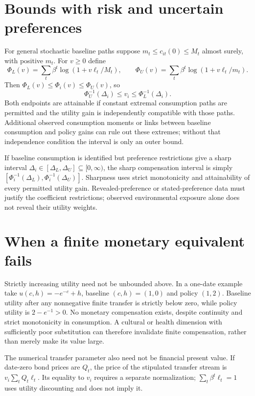 \documentclass[11pt]{article}
\begin{document}
\section*{Bounds with risk and uncertain preferences}
For general stochastic baseline paths suppose $m_t\leq c_{it}(0)\leq M_t$ almost surely, with positive $m_t$. For $v\geq0$ define
\[
 \Phi_L(v)=\sum_t\beta^t\log(1+v\ell_t/M_t),\qquad
 \Phi_U(v)=\sum_t\beta^t\log(1+v\ell_t/m_t).
\]
Then $\Phi_L(v)\leq\Phi_i(v)\leq\Phi_U(v)$, so
\[
              \Phi_U^{-1}(\Delta_i)\leq v_i\leq\Phi_L^{-1}(\Delta_i).
\]
Both endpoints are attainable if constant extremal consumption paths are permitted and the utility gain is independently compatible with those paths. Additional observed consumption moments or links between baseline consumption and policy gains can rule out these extremes; without that independence condition the interval is only an outer bound.

If baseline consumption is identified but preference restrictions give a sharp interval $\Delta_i\in[\Delta_L,\Delta_U]\subseteq[0,\infty)$, the sharp compensation interval is simply
$[\Phi_i^{-1}(\Delta_L),\Phi_i^{-1}(\Delta_U)]$.
Sharpness uses strict monotonicity and attainability of every permitted utility gain. Revealed-preference or stated-preference data must justify the coefficient restrictions; observed environmental exposure alone does not reveal their utility weights.

\section*{When a finite monetary equivalent fails}
Strictly increasing utility need not be unbounded above. In a one-date example take $u(c,h)=-e^{-c}+h$, baseline $(c,h)=(1,0)$ and policy $(1,2)$. Baseline utility after any nonnegative finite transfer is strictly below zero, while policy utility is $2-e^{-1}>0$. No monetary compensation exists, despite continuity and strict monotonicity in consumption. A cultural or health dimension with sufficiently poor substitution can therefore invalidate finite compensation, rather than merely make its value large.

The numerical transfer parameter also need not be financial present value. If date-zero bond prices are $Q_t$, the price of the stipulated transfer stream is $v_i\sum_tQ_t\ell_t$. Its equality to $v_i$ requires a separate normalization; $\sum_t\beta^t\ell_t=1$ uses utility discounting and does not imply it.
\end{document}
